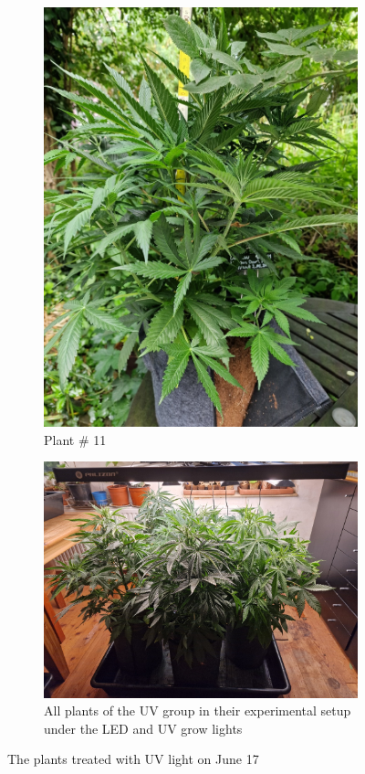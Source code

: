 \begin{figure}[htbp]
\begin{subfigure}[t]{.28\textwidth}
        \includegraphics[width=\linewidth]{plant_11_2024-06-17}
        \caption{Plant \# 11}
        \label{fig:plant_11_2024-06-17}
    \end{subfigure}
    \begin{subfigure}[t]{.85\textwidth}
        \includegraphics[width=\linewidth]{plant_uv_2024-06-17}
        \caption{All plants of the UV group in their experimental setup under the LED and UV grow lights}
        \label{fig:plant_uv_2024-06-17}
    \end{subfigure}
    \caption[Plants of the UV group on June 17]{The plants treated with UV light on June 17}
    \label{fig:plants_uv_2024-06-17}
\end{figure}

